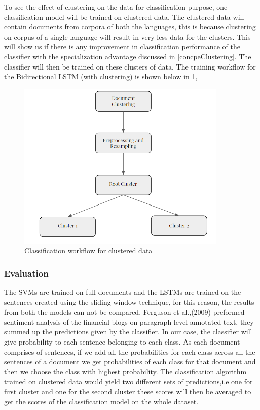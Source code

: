 To see the effect of clustering on the data for classification purpose, one classification model will be trained on clustered data. The clustered data will contain documents from corpora of both the languages, this is because clustering on corpus of a single language will result in very less data for the clusters. This will show us if there is any improvement in classification performance of the classifier with the specialization advantage discussed in \ref{concpeClustering}. The classifier will then be trained on these clusters of data. The training workflow for the Bidirectional LSTM (with clustering) is shown below in \ref{fig:clusterFlowClassification}, 

\begin{figure}[!ht]
    \centering
    \includegraphics[width=10cm,keepaspectratio]{pics/clusterClassificationFlow.png}
    \caption{Classification workflow for clustered data}
    \label{fig:clusterFlowClassification}
\end{figure}

\subsubsection*{Evaluation} \label{evaluationQuestionOne}
The SVMs are trained on full documents and the LSTMs are trained on the sentences created using the  sliding window technique, for this reason, the results from both the models can not be compared. Ferguson et al.,(2009) \cite{ferguson2009exploring} preformed sentiment analysis of the financial blogs on paragraph-level 
annotated text, they summed up the predictions given by the classifier. In our case, the classifier will give probability to each sentence belonging to each class. As each document comprises of sentences, if we add all the probabilities for each class across all the sentences of a document we get probabilities of each class for that document and then we choose the class with highest probability. The classification algorithm trained on clustered data would yield two different sets of predictions,i.e one for first cluster and one for the second cluster these scores will then be averaged to get the scores of the classification model on the whole dataset.

